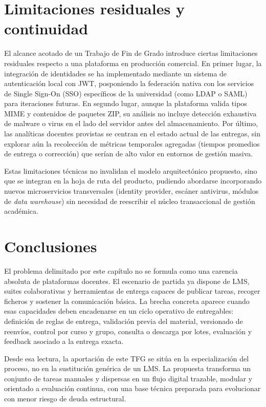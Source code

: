 \FloatBarrier
\section{Limitaciones residuales y continuidad}

El alcance acotado de un Trabajo de Fin de Grado introduce ciertas limitaciones residuales respecto a una plataforma en producci\'on comercial. En primer lugar, la integraci\'on de identidades se ha implementado mediante un sistema de autenticaci\'on local con JWT, posponiendo la federaci\'on nativa con los servicios de Single Sign-On (SSO) espec\'ificos de la universidad (como LDAP o SAML) para iteraciones futuras. En segundo lugar, aunque la plataforma valida tipos MIME y contenidos de paquetes ZIP, su an\'alisis no incluye detecci\'on exhaustiva de malware o virus en el lado del servidor antes del almacenamiento. Por \'ultimo, las anal\'iticas docentes provistas se centran en el estado actual de las entregas, sin explorar a\'un la recolecci\'on de m\'etricas temporales agregadas (tiempos promedios de entrega o correcci\'on) que ser\'ian de alto valor en entornos de gesti\'on masiva.

Estas limitaciones t\'ecnicas no invalidan el modelo arquitect\'onico propuesto, sino que se integran en la hoja de ruta del producto, pudiendo abordarse incorporando nuevos microservicios transversales (identity provider, esc\'aner antivirus, m\'odulos de \emph{data warehouse}) sin necesidad de reescribir el n\'ucleo transaccional de gesti\'on acad\'emica.

\FloatBarrier
\section{Conclusiones}

El problema delimitado por este cap\'itulo no se formula como una carencia absoluta de plataformas docentes. El escenario de partida ya dispone de LMS, suites colaborativas y herramientas de entrega capaces de publicar tareas, recoger ficheros y sostener la comunicaci\'on b\'asica. La brecha concreta aparece cuando esas capacidades deben encadenarse en un ciclo operativo de entregables: definici\'on de reglas de entrega, validaci\'on previa del material, versionado de reenv\'ios, control por curso y grupo, consulta o descarga por lotes, evaluaci\'on y feedback asociado a la entrega exacta.

Desde esa lectura, la aportaci\'on de este TFG se sit\'ua en la especializaci\'on del proceso, no en la sustituci\'on gen\'erica de un LMS. La propuesta transforma un conjunto de tareas manuales y dispersas en un flujo digital trazable, modular y orientado a evaluaci\'on continua, con una base t\'ecnica preparada para evolucionar con menor riesgo de deuda estructural.
